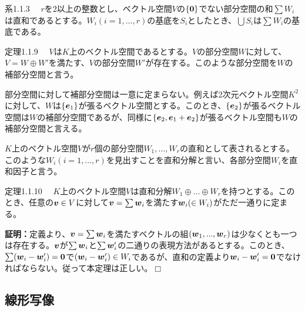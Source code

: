 \documentclass[dvipdfmx, 9pt, a4paper]{jsarticle}
\numberwithin{equation}{subsection}
\newcommand{\bm}[1]{{\mbox{\boldmath $#1$}}}
\def\qed{\hfill $\Box$}
\begin{document}
\begin{itembox}[l]{系1.1.3}
　$r$を2以上の整数とし、ベクトル空間$V$の$\{ \bm 0\}$でない部分空間の和$\sum W_i$は直和であるとする。$W_i(i=1, ..., r)$の基底を$S_i$としたとき、$\bigcup S_i$は$\sum W_i$の基底である。
\end{itembox}
\begin{itembox}[l]{定理1.1.9}
　$V$は$K$上のベクトル空間であるとする。$V$の部分空間$W$に対して、$V=W \oplus W'$を満たす、$V$の部分空間$W'$が存在する。このような部分空間を$W$の補部分空間と言う。
\end{itembox}\par
部分空間に対して補部分空間は一意に定まらない。例えば2次元ベクトル空間$K^2$に対して、$W$は$\{ \bm e_1\}$が張るベクトル空間とする。このとき、$\{ \bm e_2\}$が張るベクトル空間は$W$の補部分空間であるが、同様に$\{ \bm e_2, \bm e_1+\bm e_2 \}$が張るベクトル空間も$W$の補部分空間と言える。\par
$K$上のベクトル空間$V$が$r$個の部分空間$W_1, ..., W_r$の直和として表されるとする。このような$W_i(i=1, ..., r)$を見出すことを直和分解と言い、各部分空間$W_i$を直和因子と言う。
\begin{itembox}[l]{定理1.1.10}
　$K$上のベクトル空間$V$は直和分解$W_1 \oplus ... \oplus W_r$を持つとする。このとき、任意の$\bm v \in V$に対して$\bm v=\sum \bm w_i$を満たす$\bm w_i(\in W_i)$がただ一通りに定まる。
\end{itembox}
{\bf 証明：}定義より、$\bm v=\sum \bm w_i$を満たすベクトルの組$(\bm w_1, ..., \bm w_r)$は少なくとも一つは存在する。$\bm v$が$\sum \bm w_i$と$\sum \bm w'_i$の二通りの表現方法があるとする。このとき、$\sum (\bm w_i - \bm w'_i)=\bm 0$で$(\bm w_i - \bm w'_i) \in W_i$であるが、直和の定義より$\bm w_i - \bm w'_i=\bm 0$でなければならない。従って本定理は正しい。\qed
\subsection{線形写像}
\end{document}
